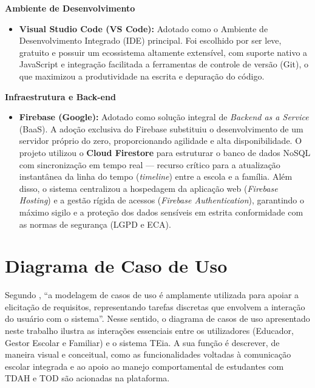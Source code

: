 \vspace{0.3cm}
\noindent\textbf{Ambiente de Desenvolvimento}

\begin{itemize}
    \item \textbf{Visual Studio Code (VS Code):} Adotado como o Ambiente de Desenvolvimento Integrado (IDE) principal. Foi escolhido por ser leve, gratuito e possuir um ecossistema altamente extensível, com suporte nativo a JavaScript e integração facilitada a ferramentas de controle de versão (Git), o que maximizou a produtividade na escrita e depuração do código.
\end{itemize}

\vspace{0.3cm}
\noindent\textbf{Infraestrutura e Back-end}

\begin{itemize}
    \item \textbf{Firebase (Google):} Adotado como solução integral de \textit{Backend as a Service} (BaaS). A adoção exclusiva do Firebase substituiu o desenvolvimento de um servidor próprio do zero, proporcionando agilidade e alta disponibilidade. O projeto utilizou o \textbf{Cloud Firestore} para estruturar o banco de dados NoSQL com sincronização em tempo real — recurso crítico para a atualização instantânea da linha do tempo (\textit{timeline}) entre a escola e a família. Além disso, o sistema centralizou a hospedagem da aplicação web (\textit{Firebase Hosting}) e a gestão rígida de acessos (\textit{Firebase Authentication}), garantindo o máximo sigilo e a proteção dos dados sensíveis em estrita conformidade com as normas de segurança (LGPD e ECA).
\end{itemize}

\vspace{0.5cm}
\section{Diagrama de Caso de Uso}

Segundo , “a modelagem de casos de uso é amplamente utilizada para apoiar a elicitação de requisitos, representando tarefas discretas que envolvem a interação do usuário com o sistema”. Nesse sentido, o diagrama de casos de uso apresentado neste trabalho ilustra as interações essenciais entre os utilizadores (Educador, Gestor Escolar e Familiar) e o sistema TEia. A sua função é descrever, de maneira visual e conceitual, como as funcionalidades voltadas à comunicação escolar integrada e ao apoio ao manejo comportamental de estudantes com TDAH e TOD são acionadas na plataforma.

